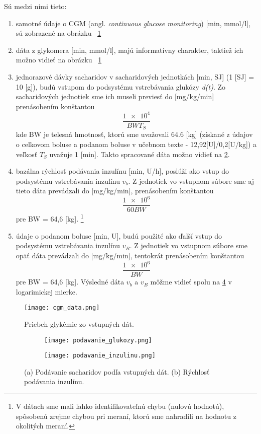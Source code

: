 \documentclass[11pt]{article} %
\begin{document}
Sú medzi nimi tieto:
\begin{enumerate}
\item samotné údaje o CGM (angl. \textit{continuous glucose monitoring}) [min, mmol/l], sú zobrazené na obrázku ~\ref{fig:cgm_glykemia}
\item dáta z glykomera [min, mmol/l], majú informatívny charakter, taktiež ich možno vidieť na obrázku ~\ref{fig:cgm_glykemia}
\item jednorazové dávky sacharidov v sacharidových jednotkách [min, SJ] (1 [SJ] = 10 [g]), budú vstupom do podsystému vstrebávania glukózy \textit{d(t)}. Zo sacharidových jednotiek sme ich museli previesť do [mg/kg/min] prenásobením konštantou \[ \frac{\num{1e4}}{BW T_S} \] kde BW je telesná hmotnosť, ktorú sme uvažovali 64.6 [kg] (získané z údajov o celkovom boluse a podanom boluse v učebnom texte - 12,92[U]/0,2[U/kg]) a veľkosť $T_S$ uvažuje 1 [min]. Takto spracované dáta možno vidieť na \ref{fig:Ng1}.
\item bazálna rýchlosť podávania inzulínu [min, U/h], poslúži ako vstup do podsystému vstrebávania inzulínu $v_b$. Z jednotiek vo vstupnom súbore sme aj tieto dáta prevádzali do [mg/kg/min], prenásobením konštantou \[ \frac{\num{1e6}}{60 BW} \] pre BW = 64,6 [kg]. \footnote{V dátach sme mali ľahko identifikovateľnú chybu (nulovú hodnotú), spôsobenú zrejme chybou pri meraní, ktorú sme nahradili na hodnotu z okolitých meraní.}
\item údaje o podanom boluse [min, U], budú použité ako ďalší vstup do podsystému vstrebávania inzulínu $v_B$. Z jednotiek vo vstupnom súbore sme opäť dáta prevádzali do [mg/kg/min], tentokrát prenásobením konštantou \[ \frac{\num{1e6}}{BW} \] pre BW = 64,6 [kg]. Výsledné dáta $v_b$ a $v_B$ môžme vidieť spolu na \ref{fig:Ng2} v logarimickej mierke.
\end{enumerate}

\newpage

\begin{figure}[h] 
	\centering
	\texttt{[image: cgm\_data.png]} 
	\caption{Priebeh glykémie zo vstupných dát.}
	\label{fig:cgm_glykemia}
\end{figure}

\begin{figure}[h]
\centering
\begin{subfigure}[b]{0.7\textwidth}
   \texttt{[image: podavanie\_glukozy.png]}
   \caption{}
   \label{fig:Ng1} 
\end{subfigure}

\begin{subfigure}[b]{0.7\textwidth}
   \texttt{[image: podavanie\_inzulinu.png]}
   \caption{}
   \label{fig:Ng2}
\end{subfigure}
\caption[Two numerical solutions]{(a) Podávanie sacharidov podľa vstupných dát. 
(b) Rýchlosť podávania inzulínu.}
\end{figure}
\end{document}
